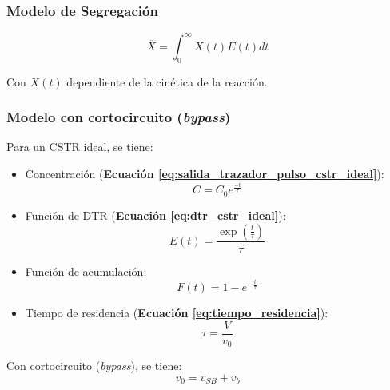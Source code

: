             \subsubsection{Modelo de Segregación}
            
            \begin{quote}
                \textit{}
            \end{quote}
            
            \begin{equation}
            \label{eq:modelo_segregacion}
                \overline{X} = \int_{0}^{\infty} X(t) E(t) dt
            \end{equation}
            
            Con \(X(t)\) dependiente de la cinética de la reacción.
            
            \subsubsection{Modelo con cortocircuito (\textit{bypass})}
            
            Para un CSTR ideal, se tiene:
            
            \begin{multicols}{2}
                \begin{itemize}
                    \item Concentración (\textbf{Ecuación \ref{eq:salida_trazador_pulso_cstr_ideal}}):
                    \[C = C_{0} e^{\frac{-t}{\tau}}\]
                    \item Función de DTR (\textbf{Ecuación \ref{eq:dtr_cstr_ideal}}):
                    \[E(t) = \frac{\exp(\frac{t}{\tau})}{\tau}\]
                    \item Función de acumulación:
                    \[F(t) = 1 - e^{-\frac{t}{\tau}}\]
                    \item Tiempo de residencia (\textbf{Ecuación \ref{eq:tiempo_residencia}}):
                    \[\tau = \frac{V}{v_{0}}\]
                \end{itemize}
            \end{multicols}
            
            Con cortocircuito (\textit{bypass}), se tiene:
            \[v_{0} = v_{SB} + v_{b}\]
            
